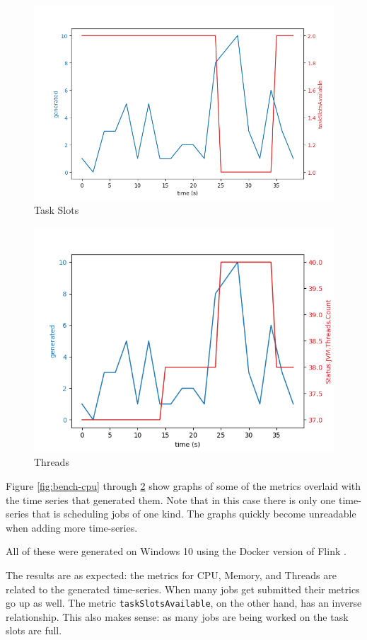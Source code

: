 \begin{figure}
   \centering
   \includegraphics[scale=0.60]{figures/task-slots.png}
\caption{Task Slots}    
\label{fig:bench-taks}
\end{figure}

\begin{figure}
   \centering
   \includegraphics[scale=0.70]{figures/threads.png}
\caption{Threads}    
\label{fig:bench-threads}
\end{figure}

Figure \ref{fig:bench-cpu} through \ref{fig:bench-threads} show graphs of some of the metrics overlaid with the time series that generated them. Note that in this case there is only one time-series that is scheduling jobs of one kind. The graphs quickly become unreadable when adding more time-series. 

All of these were generated on Windows 10 using the Docker version of Flink \parencite{flinkdocker}.

The results are as expected: the metrics for CPU, Memory, and Threads are related to the generated time-series. When many jobs get submitted their metrics go up as well. The metric \texttt{taskSlotsAvailable}, on the other hand, has an inverse relationship. This also makes sense: as many jobs are being worked on the task slots are full. 